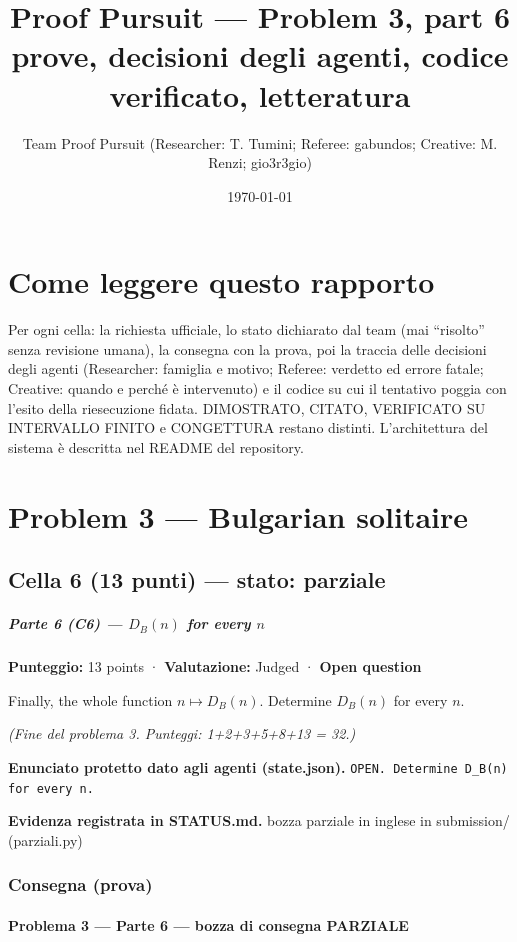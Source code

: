 \documentclass[11pt,a4paper]{article}
\title{Proof Pursuit --- Problem 3, part 6\\ \large prove, decisioni degli agenti, codice verificato, letteratura}
\author{Team Proof Pursuit (Researcher: T. Tumini; Referee: gabundos; Creative: M. Renzi; gio3r3gio)}
\date{\today}
\begin{document}
\maketitle\tableofcontents
\section*{Come leggere questo rapporto}
Per ogni cella: la richiesta ufficiale, lo stato dichiarato dal team (mai ``risolto'' senza revisione umana), la consegna
con la prova, poi la traccia delle decisioni degli agenti (Researcher: famiglia e motivo; Referee: verdetto ed errore
fatale; Creative: quando e perché è intervenuto) e il codice su cui il tentativo poggia con l'esito della riesecuzione
fidata. DIMOSTRATO, CITATO, VERIFICATO SU INTERVALLO FINITO e CONGETTURA restano distinti. L'architettura del sistema
è descritta nel README del repository.
\section{Problem 3 — Bulgarian solitaire}
\subsection{Cella 6 (13 punti) — stato: parziale}
\subparagraph{\texorpdfstring{Parte 6 (C6) --- \(D_B(n)\) for every
\(n\)}{Parte 6 (C6) --- D\_B(n) for every n}}\label{parte-6-c6-d_bn-for-every-n}

\textbf{Punteggio:} 13 points · \textbf{Valutazione:} Judged ·
\textbf{Open question}

Finally, the whole function \(n \mapsto D_B(n)\). Determine \(D_B(n)\)
for every \(n\).

\emph{(Fine del problema 3. Punteggi: 1+2+3+5+8+13 = 32.)}

\textbf{Enunciato protetto dato agli agenti (state.json).} \texttt{OPEN. Determine D\_B(n) for every n.}

\textbf{Evidenza registrata in STATUS.md.} bozza parziale in inglese in submission/ (parziali.py)

\subsubsection{Consegna (prova)}
\paragraph{Problema 3 --- Parte 6 --- bozza di consegna
PARZIALE}\label{problema-3-parte-6-bozza-di-consegna-parziale}
\end{document}
